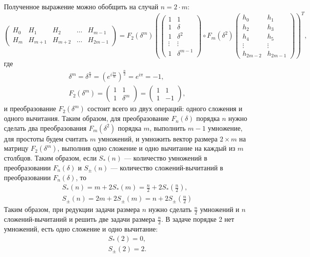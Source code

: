 Полученное выражение можно обобщить на случай $n=2 \cdot m$:
\[
    \begin{pmatrix}
        H_0 & H_1     & H_2     & \dots & H_{m-1}  \\
        H_m & H_{m+1} & H_{m+2} & \dots & H_{2m-1}
    \end{pmatrix}
    =
    F_2(\delta^{m})
    \left (
    \begin{pmatrix}
        1      & 1        \\
        1      & \delta   \\
        1      & \delta^2 \\
        \vdots & \vdots   \\
        1      & \delta^{m-1}
    \end{pmatrix}
    \circ
    F_m(\delta^2)
    \begin{pmatrix}
        h_0        & h_1      \\
        h_2        & h_3      \\
        h_4        & h_5      \\
        \vdots     & \vdots   \\
        h_{2m - 2} & h_{2m-1}
    \end{pmatrix}
    \right )^T ,
\]
где
\begin{gather*}
    \delta^m
    = \delta^\frac{n}{2}
    = \left ( e^{i \frac{2 \pi}{n}}\right )^\frac{n}{2}
    = e^{i \pi}
    = -1 , \\
    F_2(\delta^m)
    = \begin{pmatrix}
        1 & 1 \\
        1 & \delta^m
    \end{pmatrix}
    = \begin{pmatrix}
        1 & 1 \\
        1 & -1
    \end{pmatrix} ,
\end{gather*}
и преобразование $F_2(\delta^m)$ состоит всего из двух операций: одного сложения и одного вычитания. Таким образом, для преобразование $F_n(\delta)$
порядка $n$ нужно сделать два преобразования $F_m(\delta^2)$ порядка $m$, выполнить $m-1$ умножение, для простоты будем считать $m$ умножений, и 
умножить вектор размера $2 \times m$ на матрицу $F_2(\delta^m)$, выполнив одно сложение и одно вычитание на каждый из $m$ столбцов. Таким образом,
если $S_*(n)$ --- количество умножений в преобразовании $F_n(\delta)$ и $S_\pm(n)$ --- количество сложений-вычитаний в преобразовании $F_n(\delta)$,
то 
\begin{gather*}
    S_*(n)
    = m + 2 S_*(m)
    = \frac{n}{2} + 2 S_* \left( \frac{n}{2} \right) , \\
    S_\pm(n)
    = 2 m + 2 S_\pm(m)
    = n + 2 S_\pm \left( \frac{n}{2} \right)
\end{gather*}
Таким образом, при редукции задачи размера $n$ нужно сделать $\frac{n}{2}$ умножений и $n$ сложений-вычитаний и решить две задачи размера $\frac{n}{2}$.
В задаче порядке 2 нет умножений, есть одно сложение и одно вычитание:
\begin{gather*}
    S_*(2) = 0, \\
    S_\pm(2) = 2 .
\end{gather*}

